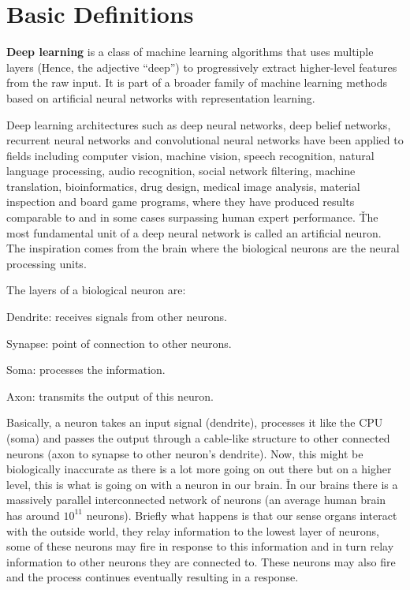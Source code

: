 \section{Basic Definitions}

\textbf{Deep learning} is a class of machine learning algorithms that uses multiple layers (Hence, the adjective
``deep'') to progressively extract higher-level features from the raw input. It is part of a broader family of
machine learning methods based on artificial neural networks with representation learning.
\ed

Deep learning architectures such as deep neural networks, deep belief networks, recurrent neural networks and
convolutional neural networks have been applied to fields including computer vision, machine vision, speech
recognition, natural language processing, audio recognition, social network filtering, machine translation,
bioinformatics, drug design, medical image analysis, material inspection and board game programs, where they have
produced results comparable to and in some cases surpassing human expert performance. \v

The most fundamental unit of a deep neural network is called an artificial neuron. The inspiration comes from the
brain where the biological neurons are the neural processing units.


The layers of a biological neuron are:
\bit
\item Dendrite: receives signals from other neurons.
\item Synapse: point of connection to other neurons.
\item Soma: processes the information.
\item Axon: transmits the output of this neuron.
\eit

Basically, a neuron takes an input signal (dendrite), processes it like the CPU (soma) and passes the output through
a cable-like structure to other connected neurons (axon to synapse to other neuron's dendrite). Now, this might be
biologically inaccurate as there is a lot more going on out there but on a higher level, this is what is going on
with a neuron in our brain. \v

In our brains there is a massively parallel interconnected network of neurons (an average human brain has around
$10^{11}$ neurons). Briefly what happens is that our sense organs interact with the outside world, they relay
information to the lowest layer of neurons, some of these neurons may fire in response to this information and in
turn relay information to other neurons they are connected to. These neurons may also fire and the process continues
eventually resulting in a response.

